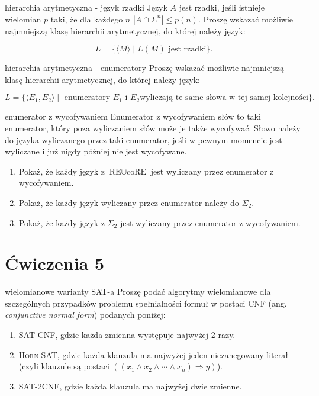 \begin{exercise}{hierarchia arytmetyczna - język rzadki}
    Język $A$ jest rzadki, jeśli istnieje wielomian $p$ taki, że dla każdego $n$ $|A \cap \Sigma^n| \leq p(n)$. Proszę wskazać możliwie najmniejszą klasę hierarchii arytmetycznej, do której należy język:

$$L = \{\langle M \rangle \mid  L(M) \text{ jest rzadki} \}.$$
\end{exercise}

\begin{exercise}{hierarchia arytmetyczna - enumeratory}
    Proszę wskazać możliwie najmniejszą klasę hierarchii arytmetycznej, do której należy język:

$$L = \{\langle E_1,E_2 \rangle \mid  \text{ enumeratory } E_1 \text{ i } E_2 \text{wyliczają te same słowa w tej samej kolejności} \}.$$
\end{exercise}

\begin{exercise}{enumerator z wycofywaniem}
    Enumerator z wycofywaniem słów to taki enumerator, który poza wyliczaniem słów może je także wycofywać. Słowo należy do języka wyliczanego przez taki enumerator, jeśli w pewnym momencie jest wyliczane i już nigdy później nie jest wycofywane.

\begin{enumerate}
    \item Pokaż, że każdy język z $\text{RE} \cup \text{coRE}$ jest wyliczany przez enumerator z wycofywaniem.
    \item Pokaż, że każdy język wyliczany przez enumerator należy do $\Sigma_2$.
    \item Pokaż, że każdy język z $\Sigma_2$ jest wyliczany przez enumerator z wycofywaniem.
\end{enumerate}
\end{exercise}

\section{Ćwiczenia 5}

\begin{exercise}{wielomianowe warianty SAT-a}
    Proszę podać algorytmy wielomianowe dla szczególnych przypadków problemu spełnialności formuł w postaci CNF (ang. \textit{conjunctive normal form}) podanych poniżej:
\begin{enumerate}
    \item SAT-CNF, gdzie każda zmienna występuje najwyżej 2 razy.
    \item \textsc{Horn}-SAT, gdzie każda klauzula ma najwyżej jeden niezanegowany literał (czyli klauzule są postaci $((x_1 \land x_2 \land \cdots \land x_n) \Rightarrow y)$).
    \item SAT-2CNF, gdzie każda klauzula ma najwyżej dwie zmienne.
\end{enumerate}
\end{exercise}

